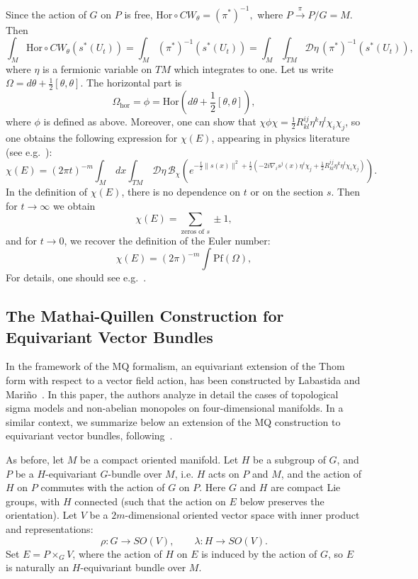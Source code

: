 \documentclass[a4paper,12pt,reqno,sumlimits]{amsart}
\theoremstyle{plain}
\theoremstyle{definition}
\newcommand{\1}{{\bf 1}}
\newcommand{\ex}[1]{{e^{#1}}}
\newcommand{\calB}{{\mathcal B}}
\newcommand{\calD}{{\mathcal D}}
\renewcommand{\to}{\longrightarrow}
\newcommand{\inv}{^{-1}}
\newcommand{\norm}[1]{\| #1 \|}
\numberwithin{equation}{section}
\begin{document}
Since the action of $G$ on $P$ is free, $\text{Hor}\circ
CW_{\theta}=(\pi^*)\inv,$ where $P\stackrel{\pi}{\to}P/G=M$.  Then
$$
\int_M\text{Hor}\circ CW_{\theta}(s^*(U_t)) = \int_M(\pi^*)\inv(s^*(U_t))
=\int_M\int_{TM}\calD\eta\, (\pi^*)\inv(s^*(U_t)),
$$
where $\eta$ is a fermionic variable on $TM$ which integrates to one.  Let
us write $\Omega=d\theta+\frac{1}{2}[\theta,\theta]$. The horizontal part is
$$
\Omega_{\text{hor}}=\phi=\text{Hor}\left(d\theta+\frac{1}{2}[\theta,\theta]\right),
$$
where $\phi$ is defined as above. Moreover, one can show that
$\chi\phi\chi=\displaystyle\frac{1}{2}R^{ij}_{kl}\eta^k\eta^l\chi_i\chi_j$,
so one obtains the following expression for $\chi(E)$, appearing in physics
literature (see e.g.~\cite{labastida_marino1}):
$$
\chi(E)=(2\pi t)^{-m}\int_M\,dx\int_{TM}\,\calD\eta\,\calB_\chi\left(
  \ex{-\frac{t}{2}\norm{s(x)}^2 
    +\frac{t}{2}(-2i\nabla_i s^j(x)\eta^i\chi_j+
    \frac{1}{2}R^{ij}_{kl}\eta^k\eta^l\chi_i\chi_j)}\right).
$$
In the definition of $\chi(E)$, there is no dependence on $t$ or on the
section $s$. Then for $t\to\infty$ we obtain
$$
\chi(E)=\sum_{\text{zeros of }s}\pm 1,
$$
and for $t\to 0$, we recover the definition of the Euler number:
$$
\chi(E)=(2\pi)^{-m}\int\text{Pf}(\Omega),
$$
For details, one should see e.g.~\cite[p. 111]{cordes}.



\subsection{The Mathai-Quillen Construction for Equivariant Vector Bundles}
\label{mqeqvb}

In the framework of the MQ formalism, an equivariant extension of the Thom
form with respect to a vector field action, has been constructed by Labastida
and Mari\~no~\cite{labastida_marino2}. In this paper, the authors analyze in
detail the cases of topological sigma models and non-abelian monopoles on
four-dimensional manifolds.  In a similar context, we summarize below an
extension of the MQ construction to equivariant vector bundles,
following~\cite[Secs. 2.3, 2.6]{radu}.

As before, let $M$ be a compact oriented manifold.  Let $H$ be a subgroup of
$G$, and $P$ be a $H$-equivariant $G$-bundle over $M$, i.e. $H$ acts on $P$
and $M$, and the action of $H$ on $P$ commutes with the action of $G$ on $P$.
Here $G$ and $H$ are compact Lie groups, with $H$ connected (such that the
action on $E$ below preserves the orientation).  Let $V$ be a
$2m$-dimensional oriented vector space with inner product and
representations:
$$
\rho:G\to SO(V),\qquad\lambda:H\to SO(V).
$$
Set $E=P\times_G V$, where the action of $H$ on $E$ is induced by the
action of $G$, so $E$ is naturally an $H$-equivariant bundle over $M$.
\end{document}
